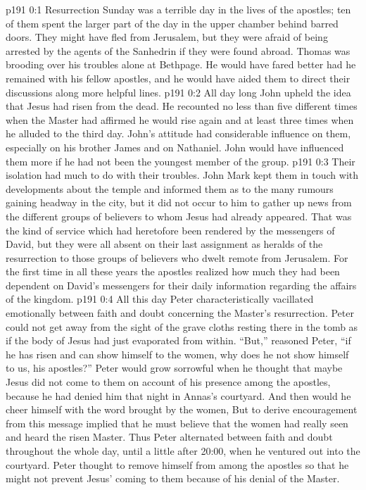 \author{Midwayer Commission}
\vs p191 0:1 Resurrection Sunday was a terrible day in the lives of the apostles; ten of them spent the larger part of the day in the upper chamber behind barred doors. They might have fled from Jerusalem, but they were afraid of being arrested by the agents of the Sanhedrin if they were found abroad. Thomas was brooding over his troubles alone at Bethpage. He would have fared better had he remained with his fellow apostles, and he would have aided them to direct their discussions along more helpful lines.
\vs p191 0:2 All day long John upheld the idea that Jesus had risen from the dead. He recounted no less than five different times when the Master had affirmed he would rise again and at least three times when he alluded to the third day. John’s attitude had considerable influence on them, especially on his brother James and on Nathaniel. John would have influenced them more if he had not been the youngest member of the group.
\vs p191 0:3 Their isolation had much to do with their troubles. John Mark kept them in touch with developments about the temple and informed them as to the many rumours gaining headway in the city, but it did not occur to him to gather up news from the different groups of believers to whom Jesus had already appeared. That was the kind of service which had heretofore been rendered by the messengers of David, but they were all absent on their last assignment as heralds of the resurrection to those groups of believers who dwelt remote from Jerusalem. For the first time in all these years the apostles realized how much they had been dependent on David’s messengers for their daily information regarding the affairs of the kingdom.
\vs p191 0:4 All this day Peter characteristically vacillated emotionally between faith and doubt concerning the Master’s resurrection. Peter could not get away from the sight of the grave cloths resting there in the tomb as if the body of Jesus had just evaporated from within. “But,” reasoned Peter, “if he has risen and can show himself to the women, why does he not show himself to us, his apostles?” Peter would grow sorrowful when he thought that maybe Jesus did not come to them on account of his presence among the apostles, because he had denied him that night in Annas’s courtyard. And then would he cheer himself with the word brought by the women,  But to derive encouragement from this message implied that he must believe that the women had really seen and heard the risen Master. Thus Peter alternated between faith and doubt throughout the whole day, until a little after 20:00, when he ventured out into the courtyard. Peter thought to remove himself from among the apostles so that he might not prevent Jesus’ coming to them because of his denial of the Master.
